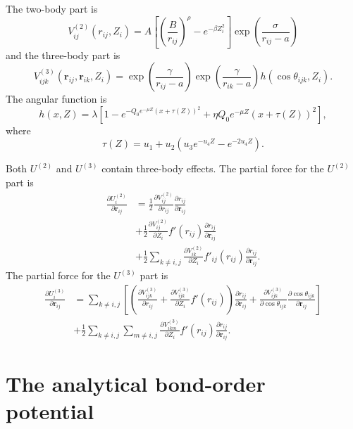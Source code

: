 \documentclass[12pt,a4paper]{report}
\newcommand{\vect}[1]{\boldsymbol{#1}}
\begin{document}
The two-body part is
\begin{equation}
V^{(2)}_{ij}(r_{ij},Z_i) =  A
\left[ \left( \frac{B }{ r_{ij} } \right)^{\rho}- e^{-\beta Z_i^2} \right]
\exp\left(   \frac{\sigma}{ r_{ij} - a} \right)
\end{equation}
and the three-body part is
\begin{equation}
V^{(3)}_{ijk}(\vect{r}_{ij}, \vect{r}_{ik}, Z_i) =
\exp\left(   \frac{\gamma}{ r_{ij} - a} \right)
\exp\left(   \frac{\gamma}{ r_{ik} - a} \right)
h \left(\cos \theta_{ijk} , Z_i \right).
\end{equation}
The angular function is
\begin{equation}
h \left(x , Z \right) =
\lambda \left[1 - e^{ -Q_0 e^{-\mu Z} (x + \tau(Z))^2}  + \eta Q_0 e^{-\mu Z} (x + \tau(Z))^2 \right],
\end{equation}
where
\begin{equation}
\tau(Z) = u_1 + u_2(u_3 e^{-u_4 Z} - e^{-2u_4 Z} ).
\end{equation}

Both $U^{(2)}$ and $U^{(3)}$ contain three-body effects. The partial force for the $U^{(2)}$ part is
\begin{align}
\frac{\partial U^{(2)}_i}{\partial \vect{r}_{ij}}
&= \frac{1}{2} \frac{\partial V^{(2)}_{ij}}{\partial r_{ij}} \frac{\partial r_{ij}}{\partial \vect{r}_{ij}} \nonumber \\
&+ \frac{1}{2} \frac{\partial V^{(2)}_{ij}}{\partial Z_{i}} f'(r_{ij}) \frac{\partial r_{ij}}{\partial \vect{r}_{ij}} \nonumber \\
&+ \frac{1}{2} \sum_{k\neq i,j} \frac{\partial V^{(2)}_{ik}}{\partial Z_{i}} f'_{ij}(r_{ij}) \frac{\partial r_{ij}}{\partial \vect{r}_{ij}}.
\end{align}
The partial force for the $U^{(3)}$ part is
\begin{align}
\frac{\partial U^{(3)}_i}{\partial \vect{r}_{ij}}
&= \sum_{k\neq i,j} 
\left[
\left( \frac{\partial V^{(3)}_{ijk}}{\partial r_{ij}} + \frac{\partial V^{(3)}_{ijk}}{\partial Z_{i}} f'(r_{ij} ) \right)
\frac{\partial r_{ij}}{\partial \vect{r}_{ij}}
+ \frac{\partial V^{(3)}_{ijk}}{\partial \cos\theta_{ijk}} \frac{\partial \cos\theta_{ijk}}{\partial \vect{r}_{ij}} 
\right]
 \nonumber \\
&+ \frac{1}{2} \sum_{k\neq i,j} \sum_{m\neq i,j} \frac{\partial V^{(3)}_{ikm}}{\partial Z_{i}} f'(r_{ij}) \frac{\partial r_{ij}}{\partial \vect{r}_{ij}}.
\end{align}

\section{The analytical bond-order potential}
\end{document}
